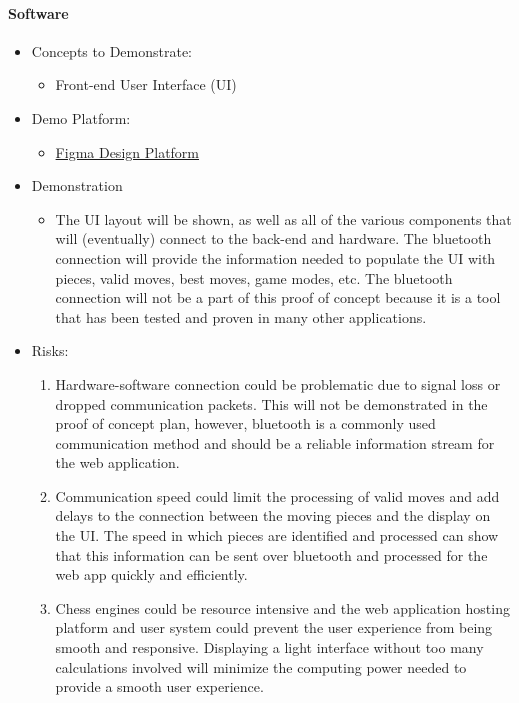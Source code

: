 \documentclass{article}
\begin{document}
\paragraph{Software}
\begin{itemize}
    \item Concepts to Demonstrate:
    \begin{itemize}
        \item Front-end User Interface (UI)
    \end{itemize}
    \item Demo Platform:
    \begin{itemize}
        \item \href{https://www.figma.com/}{Figma Design Platform}
    \end{itemize}
    \item Demonstration
    \begin{itemize}
        \item The UI layout will be shown, as well as all of the various components that will (eventually) connect to the back-end and hardware. The bluetooth connection will provide the information needed to populate the UI with pieces, valid moves, best moves, game modes, etc. The bluetooth connection will not be a part of this proof of concept because it is a tool that has been tested and proven in many other applications. 
    \end{itemize}
    \item Risks:
    \begin{enumerate}
        \item Hardware-software connection could be problematic due to signal loss or dropped communication packets. This will not be demonstrated in the proof of concept plan, however, bluetooth is a commonly used communication method and should be a reliable information stream for the web application.
        \item Communication speed could limit the processing of valid moves and add delays to the connection between the moving pieces and the display on the UI. The speed in which pieces are identified and processed can show that this information can be sent over bluetooth and processed for the web app quickly and efficiently.
        \item Chess engines could be resource intensive and the web application hosting platform and user system could prevent the user experience from being smooth and responsive. Displaying a light interface without too many calculations involved will minimize the computing power needed to provide a smooth user experience.
    \end{enumerate}
\end{itemize}
\end{document}
